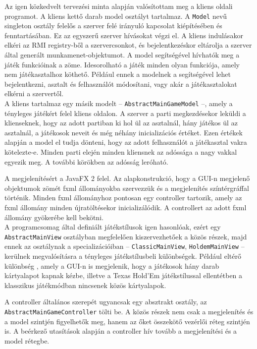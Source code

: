 Az igen közkedvelt tervezési minta alapján valósítottam meg a kliens oldali programot.
A kliens kettő darab model osztályt tartalmaz. A \texttt{Model} nevű singleton osztály felelős a szerver felé irányuló kapcsolat kiépítésében és fenntartásában. Ez az egyszerű szerver hívásokat végzi el. A kliens indulásakor elkéri az RMI registry-ből a szervercsonkot, és bejelentkezéskor eltárolja a szerver által generált munkamenet-objektumot. A model segítségével hívhatók meg a játék funkcióinak a zöme. Idesorolható a játék minden olyan funkciója, amely nem játékasztalhoz köthető. Például ennek a modelnek a segítségével lehet bejelentkezni, asztalt és felhasználót módosítani, vagy akár a játékasztalokat elkérni a szervertől. \\
A kliens tartalmaz egy másik modelt -- \texttt{AbstractMainGameModel} --, amely a tényleges játékért felel kliens oldalon. A szerver a parti megkezdésekor leküldi a klienseknek, hogy az adott partiban ki hol ül az asztalnál, hány játékos ül az asztalnál, a játékosok neveit és még néhány inicializációs értéket. Ezen értékek alapján a model el tudja dönteni, hogy az adott felhasználót a játékasztal vakra kötelezte-e. Minden parti elején minden kliensnek az adóssága a nagy vakkal egyezik meg. A további körökben az adósság leróható.

A megjelenítésért a JavaFX 2 \cite{javafx} felel. Az alapkonstrukció, hogy a GUI-n megjelenő objektumok zömét fxml állományokba szervezzük és a megjelenítés színtérgráffal történik. Minden fxml állományhoz pontosan egy controller tartozik, amely az fxml állomány minden újratöltésekor inicializálódik. A controllert az adott fxml állomány gyökerébe kell bekötni. \\
A programcsomag által definiált játékstílusok igen hasonlóak, ezért egy \texttt{AbstractMainView} osztályban megfelelően kiszervezhetőek a közös részek, majd ennek az osztálynak a specializációiban -- \texttt{ClassicMainView}, \texttt{HoldemMainView} -- kerülnek megvalósításra a tényleges játékstílusbeli különbségek. Például eltérő különbség , amely a GUI-n is megjelenik, hogy a játékosok hány darab kártyalapot kapnak kézbe, illetve a Texas Hold'Em játékstílussal ellentétben a klasszikus játékmódban nincsenek közös kártyalapok.

A controller általános szerepét ugyancsak egy absztrakt osztály, az \texttt{AbstractMainGameController} tölti be. A közös részek nem csak a megjelenítés és a model szintjén figyelhetők meg, hanem az őket összekötő vezérlői réteg szintjén is. A beérkező utasítások alapján a controller hív tovább a megjelenítési és a model rétegbe.

